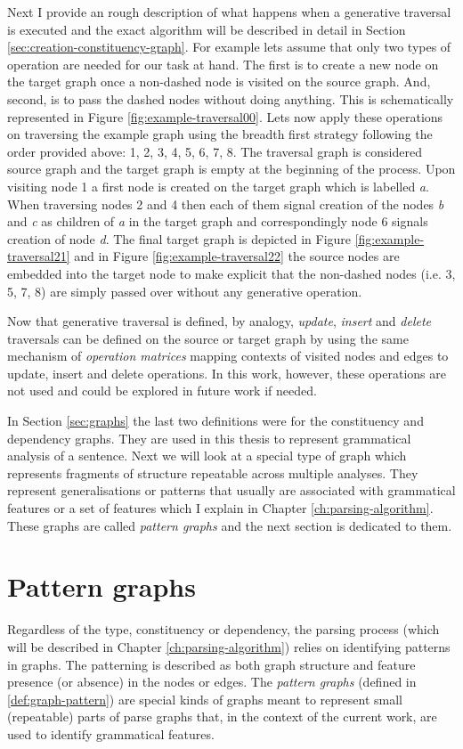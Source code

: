    Next I provide an rough description of what happens when a generative traversal is executed and the exact algorithm will be described in detail in Section \ref{sec:creation-constituency-graph}. For example lets assume that only two types of operation are needed for our task at hand. The first is to create a new node on the target graph once a non-dashed node is visited on the source graph. And, second, is to pass the dashed nodes without doing anything. This is schematically represented in Figure \ref{fig:example-traversal00}. Lets now apply these operations on traversing the example graph using the breadth first strategy following the order provided above: 1, 2, 3, 4, 5, 6, 7, 8. The traversal graph is considered source graph and the target graph is empty at the beginning of the process. Upon visiting node 1 a first node is created on the target graph which is labelled \textit{a}. When traversing nodes 2 and 4 then each of them signal creation of the nodes \textit{b} and \textit{c} as children of \textit{a} in the target graph and correspondingly node 6 signals creation of node \textit{d}. The final target graph is depicted in Figure \ref{fig:example-traversal21} and in Figure \ref{fig:example-traversal22} the source nodes are embedded into the target node to make explicit that the non-dashed nodes (i.e. 3, 5, 7, 8) are simply passed over without any generative operation. 

    Now that generative traversal is defined, by analogy, \textit{update}, \textit{insert} and \textit{delete} traversals can be defined on the source or target graph by using the same mechanism of \textit{operation matrices} mapping contexts of visited nodes and edges to update, insert and delete operations. In this work, however, these operations are not used and could be explored in future work if needed.

    In Section \ref{sec:graphs} the last two definitions were for the constituency and dependency graphs. They are used in this thesis to represent grammatical analysis of a sentence. Next we will look at a special type of graph which represents fragments of structure repeatable across multiple analyses. They represent generalisations or patterns that usually are associated with grammatical features or a set of features which I explain in Chapter \ref{ch:parsing-algorithm}. These graphs are called \textit{pattern graphs} and the next section is dedicated to them.  

\section{Pattern graphs}
\label{sec:pattern-graphs}
    Regardless of the type, constituency or dependency, the parsing process (which will be described in Chapter \ref{ch:parsing-algorithm}) relies on identifying patterns in graphs. The patterning is described as both graph structure and feature presence (or absence) in the nodes or edges. The \textit{pattern graphs} (defined in \ref{def:graph-pattern}) are special kinds of graphs meant to represent small (repeatable) parts of parse graphs that, in the context of the current work, are used to identify grammatical features. 

